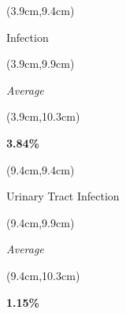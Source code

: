 \documentclass[
  11pt,
  landscape]{article}
\begin{document}

\begin{textblock*}{5cm}(3.9cm,9.4cm) %
    \centerline{\small{Infection}}
\end{textblock*}

\begin{textblock*}{5cm}(3.9cm,9.9cm) %
    \small \centerline{\textit{Average}}
\end{textblock*}

\begin{textblock*}{5cm}(3.9cm,10.3cm) %
    \centerline{\textbf{3.84\%}}
\end{textblock*}

\begin{textblock*}{5cm}(9.4cm,9.4cm) %
    \centerline{\small{Urinary Tract Infection}}
\end{textblock*}

\begin{textblock*}{5cm}(9.4cm,9.9cm) %
    \small \centerline{\textit{Average}}
\end{textblock*}

\begin{textblock*}{5cm}(9.4cm,10.3cm) %
    \centerline{\textbf{1.15\%}}
\end{textblock*}
\end{document}
